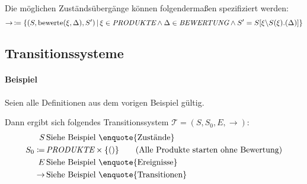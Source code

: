 																Die möglichen Zuständsübergänge können folgendermaßen spezifiziert werden:
																\begin{equation*}
																	\rightarrow\, \coloneqq \{ (S, \text{bewerte}(\xi, \Delta), S') \,\vert\, \xi \in \textit{PRODUKTE} \land \Delta \in \textit{BEWERTUNG} \land S' = S[\xi \backslash S(\xi).(\Delta)] \}
																\end{equation*}

														\subsection{Transitionssysteme}


															\paragraph{Beispiel}
																Seien alle Definitionen aus dem vorigen Beispiel gültig.

																Dann ergibt sich folgendes Transitionssystem $ \mathcal{T} = (S, S _ 0, E, \rightarrow) $:
																\begin{align*}
																	S               & \, \text{Siehe Beispiel \enquote{Zustände}}                                     \\
																	S _ 0 \coloneqq & \, \textit{PRODUKTE} \times \{ () \} \tag{Alle Produkte starten ohne Bewertung} \\
																	E               & \, \text{Siehe Beispiel \enquote{Ereignisse}}                                   \\
																	\rightarrow     & \, \text{Siehe Beispiel \enquote{Transitionen}}                                 \\
																\end{align*}

